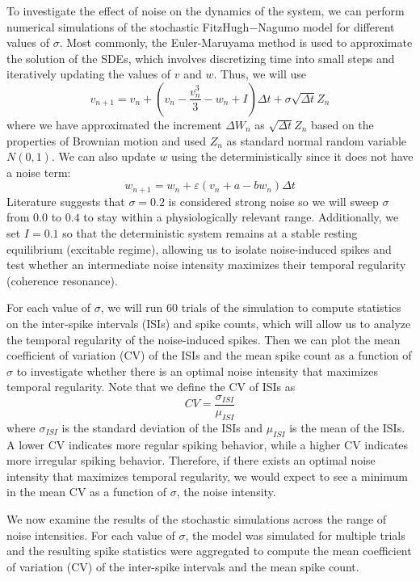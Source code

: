 \documentclass{article}
\begin{document}
To investigate the effect of noise on the dynamics of the system, we can perform numerical simulations of the stochastic FitzHugh$-$Nagumo model for different values of $\sigma$. Most commonly, the Euler-Maruyama method is used to approximate the solution of the SDEs, which involves discretizing time into small steps and iteratively updating the values of $v$ and $w$. Thus, we will use
\begin{equation}
    v_{n+1}=v_n+\left(v_n-\frac{v_n^3}{3}-w_n+I\right)\Delta t+\sigma \sqrt{\Delta t} Z_n
\end{equation}
where we have approximated the increment $\Delta W_n$ as $\sqrt{\Delta t} Z_n$ based on the properties of Brownian motion and used $Z_n$ as standard normal random variable $N(0,1)$. We can also update $w$ using the deterministically since it does not have a noise term:
\begin{equation}
    w_{n+1}=w_n+\varepsilon(v_n+a-bw_n)\Delta t
\end{equation}
Literature suggests that $\sigma=0.2$ is considered strong noise so we will sweep $\sigma$ from $0.0$ to $0.4$ to stay within a physiologically relevant range. Additionally, we set $I=0.1$ so that the deterministic system remains at a stable resting equilibrium (excitable regime), allowing us to isolate noise-induced spikes and test whether an intermediate noise intensity maximizes their temporal regularity (coherence resonance). 

For each value of $\sigma$, we will run 60 trials of the simulation to compute statistics on the inter-spike intervals (ISIs) and spike counts, which will allow us to analyze the temporal regularity of the noise-induced spikes. Then we can plot the mean coefficient of variation (CV) of the ISIs and the mean spike count as a function of $\sigma$ to investigate whether there is an optimal noise intensity that maximizes temporal regularity. Note that we define the CV of ISIs as
\begin{equation}
    CV = \frac{\sigma_{ISI}}{\mu_{ISI}}
\end{equation}
where $\sigma_{ISI}$ is the standard deviation of the ISIs and $\mu_{ISI}$ is the mean of the ISIs. A lower CV indicates more regular spiking behavior, while a higher CV indicates more irregular spiking behavior. Therefore, if there exists an optimal noise intensity that maximizes temporal regularity, we would expect to see a minimum in the mean CV as a function of $\sigma$, the noise intensity.

We now examine the results of the stochastic simulations across the range of noise intensities. For each value of $\sigma$, the model was simulated for multiple trials and the resulting spike statistics were aggregated to compute the mean coefficient of variation (CV) of the inter-spike intervals and the mean spike count.
\end{document}
